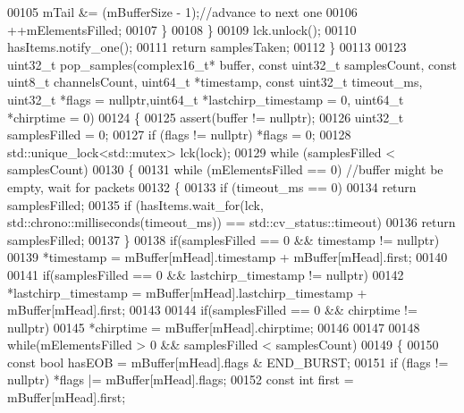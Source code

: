 \begin{DoxyCode}
00105                 mTail  &= (mBufferSize - 1);\textcolor{comment}{//advance to next one}
00106                 ++mElementsFilled;
00107             \}
00108         \}
00109         lck.unlock();
00110         hasItems.notify\_one();
00111         \textcolor{keywordflow}{return} samplesTaken;
00112     \}
00113 
00123     uint32\_t pop_samples(complex16_t* buffer, \textcolor{keyword}{const} uint32\_t samplesCount, \textcolor{keyword}{const} uint8\_t channelsCount, 
      uint64\_t *timestamp, \textcolor{keyword}{const} uint32\_t timeout_ms, uint32\_t *flags = \textcolor{keyword}{nullptr},uint64\_t *lastchirp\_timestamp = 0, 
      uint64\_t *chirptime = 0)
00124     \{
00125         assert(buffer != \textcolor{keyword}{nullptr});
00126         uint32\_t samplesFilled = 0;
00127         \textcolor{keywordflow}{if} (flags != \textcolor{keyword}{nullptr}) *flags = 0;
00128         std::unique\_lock<std::mutex> lck(lock);
00129         \textcolor{keywordflow}{while} (samplesFilled < samplesCount)
00130         \{
00131             \textcolor{keywordflow}{while} (mElementsFilled == 0) \textcolor{comment}{//buffer might be empty, wait for packets}
00132             \{
00133                 \textcolor{keywordflow}{if} (timeout\_ms == 0)
00134                     \textcolor{keywordflow}{return} samplesFilled;
00135                 \textcolor{keywordflow}{if} (hasItems.wait\_for(lck, std::chrono::milliseconds(timeout\_ms)) == 
      std::cv\_status::timeout)
00136                     \textcolor{keywordflow}{return} samplesFilled;
00137             \}
00138             \textcolor{keywordflow}{if}(samplesFilled == 0 && timestamp != \textcolor{keyword}{nullptr})
00139                 *timestamp = mBuffer[mHead].timestamp + mBuffer[mHead].first;
00140 
00141             \textcolor{keywordflow}{if}(samplesFilled == 0 && lastchirp\_timestamp != \textcolor{keyword}{nullptr})
00142                     *lastchirp\_timestamp = mBuffer[mHead].lastchirp_timestamp + 
      mBuffer[mHead].first;
00143 
00144             \textcolor{keywordflow}{if}(samplesFilled == 0 && chirptime != \textcolor{keyword}{nullptr})
00145                     *chirptime = mBuffer[mHead].chirptime;
00146 
00147 
00148             \textcolor{keywordflow}{while}(mElementsFilled > 0 && samplesFilled < samplesCount)
00149             \{
00150                 \textcolor{keyword}{const} \textcolor{keywordtype}{bool} hasEOB = mBuffer[mHead].flags & END_BURST;
00151                 \textcolor{keywordflow}{if} (flags != \textcolor{keyword}{nullptr}) *flags |= mBuffer[mHead].flags;
00152                 \textcolor{keyword}{const} \textcolor{keywordtype}{int} first = mBuffer[mHead].first;

\end{DoxyCode}

